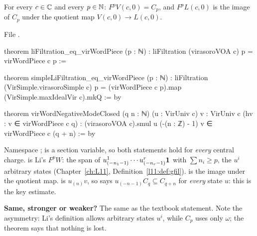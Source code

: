 \begin{theorem}\label{l20:thm:virli}
For every $c\in{\mathbb{C}}$ and every $p\in{\mathbb{N}}$: $F^pV(c,0)=C_p$, and $F^pL(c,0)$ is the image of $C_p$ under the quotient map
$V(c,0)\to L(c,0)$.
\end{theorem}
\noindent File .
\begin{leancode}
theorem liFiltration_eq_virWordPiece (p : ℕ) :
    liFiltration (virasoroVOA c) p = virWordPiece c p :=

theorem simpleLiFiltration_eq_virWordPiece (p : ℕ) :
    liFiltration (VirSimple.virasoroSimple c) p =
      (virWordPiece c p).map (VirSimple.maxIdealVir c).mkQ := by

theorem virWordNegativeModeClosed (q n : ℕ) (u : VirUniv c) {v : VirUniv c}
    (hv : v ∈ virWordPiece c q) :
    (virasoroVOA c).smul u (-(n : ℤ) - 1) v ∈ virWordPiece c (q + n) := by
\end{leancode}

\begin{dictionary}
Namespace ;  is a section variable, so both statements hold for \emph{every} central
charge.  is Li's $F^pW$: the span of $u^1_{(-n_1-1)}\cdots u^r_{(-n_r-1)}\mathbf{1}$ with
$\sum n_i\ge p$, the $u^i$ arbitrary states (Chapter~\ref{ch:L11}, Definition~\ref{l11:def:gfil}).  is
the image under the quotient map.  is $u_{(n)}v$, so  says
$u_{(-n-1)}C_q\subseteq C_{q+n}$ for \emph{every} state $u$: this is the key estimate.

\textbf{Same, stronger or weaker?} The same as the textbook statement. Note the asymmetry: Li's definition allows
arbitrary states $u^i$, while $C_p$ uses only $\omega$; the theorem says that nothing is lost.
\end{dictionary}

